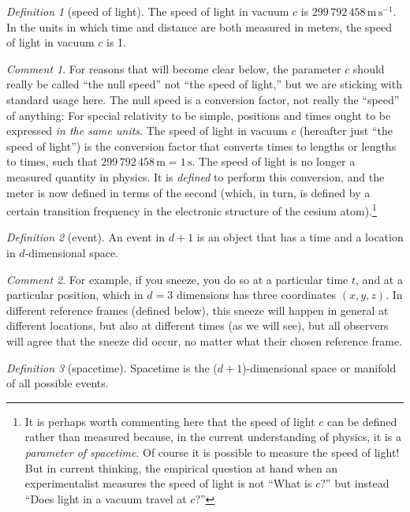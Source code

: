 \documentclass[10pt]{article}
\newcounter{par}
\theoremstyle{remark}
\newtheorem{definition}{Definition}
\theoremstyle{remark}
\newtheorem*{remark}{Comment}
\newcommand{\unit}[1]{\mathrm{#1}}
\newcommand{\m}{\unit{m}}
\newcommand{\s}{\unit{s}}
\begin{document}
\begin{definition}[speed of light]
    The speed of light in vacuum $c$ is $299\,792\,458\,\m\,\s^{-1}$.
    In the units in which time and distance are both measured in meters, the speed of light in vacuum $c$ is 1.
\end{definition}
\begin{remark}
    For reasons that will become clear below, the parameter $c$ should really be called ``the null speed'' not ``the speed of light,'' but we are sticking with standard usage here.
    The null speed is a conversion factor, not really the ``speed'' of anything:
    For special relativity to be simple, positions and times ought to be expressed \emph{in the same units}.
    The speed of light in vacuum $c$ (hereafter just ``the speed of light'') is the conversion factor that converts times to lengths or lengths to times, such that $299\,792\,458\,\m = 1\,\s$.
    The speed of light is no longer a measured quantity in physics.
    It is \emph{defined} to perform this conversion, and the meter is now defined in terms of the second (which, in turn, is defined by a certain transition frequency in the electronic structure of the cesium atom).\footnote{%
        It is perhaps worth commenting here that the speed of light $c$ can be defined rather than measured because, in the current understanding of physics, it is a \emph{parameter of spacetime}.
        Of course it is possible to measure the speed of light!
        But in current thinking, the empirical question at hand when an experimentalist measures the speed of light is not ``What is $c$?'' but instead ``Does light in a vacuum travel at $c$?''}
\end{remark}

\begin{definition}[event]
    An event in $d+1$ is an object that has a time and a location in $d$-dimensional space.
\end{definition}
\begin{remark}
    For example, if you sneeze, you do so at a particular time $t$, and at a particular position, which in $d=3$ dimensions has three coordinates $(x, y, z)$.
    In different reference frames (defined below), this sneeze will happen in general at different locations, but also at different times (as we will see), but all observers will agree that the sneeze did occur, no matter what their chosen reference frame.
\end{remark}

\begin{definition}[spacetime]
    Spacetime is the ($d+1$)-dimensional space or manifold of all possible events.
\end{definition}
\end{document}

